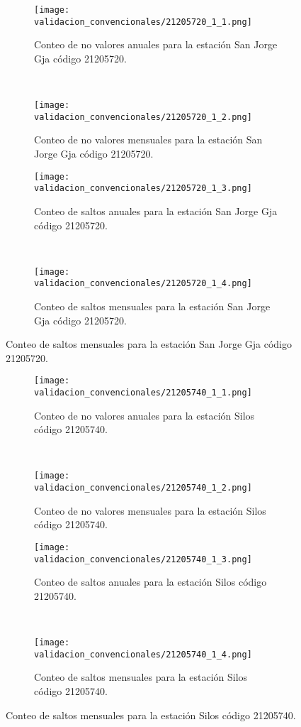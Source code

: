 \begin{figure}[H]\ContinuedFloat
\centering
	\begin{subfigure}[normla]{0.4\textwidth}
	\texttt{[image: validacion\_convencionales/21205720\_1\_1.png]}
		\caption{Conteo de no valores anuales para la estación San Jorge Gja código 21205720.}
		\label{subfig:a1}
		\end{subfigure}
		~
    \begin{subfigure}[normla]{0.4\textwidth}
	\texttt{[image: validacion\_convencionales/21205720\_1\_2.png]}
		\caption{Conteo de no valores mensuales para la estación San Jorge Gja código 21205720.}
		\label{subfig:a2}
		\end{subfigure}
		
    \begin{subfigure}[normla]{0.4\textwidth}
	\texttt{[image: validacion\_convencionales/21205720\_1\_3.png]}
		\caption{Conteo de saltos anuales para la estación San Jorge Gja código 21205720.}
		\label{subfig:a1}
		\end{subfigure}
		~
    \begin{subfigure}[normla]{0.4\textwidth}
	\texttt{[image: validacion\_convencionales/21205720\_1\_4.png]}
		\caption{Conteo de saltos mensuales para la estación San Jorge Gja código 21205720.}
		\label{subfig:a2}
		\end{subfigure}

	
\end{figure}
           
\begin{figure}[H]\ContinuedFloat
\centering
	\begin{subfigure}[normla]{0.4\textwidth}
	\texttt{[image: validacion\_convencionales/21205740\_1\_1.png]}
		\caption{Conteo de no valores anuales para la estación Silos código 21205740.}
		\label{subfig:a1}
		\end{subfigure}
		~
    \begin{subfigure}[normla]{0.4\textwidth}
	\texttt{[image: validacion\_convencionales/21205740\_1\_2.png]}
		\caption{Conteo de no valores mensuales para la estación Silos código 21205740.}
		\label{subfig:a2}
		\end{subfigure}
		
    \begin{subfigure}[normla]{0.4\textwidth}
	\texttt{[image: validacion\_convencionales/21205740\_1\_3.png]}
		\caption{Conteo de saltos anuales para la estación Silos código 21205740.}
		\label{subfig:a1}
		\end{subfigure}
		~
    \begin{subfigure}[normla]{0.4\textwidth}
	\texttt{[image: validacion\_convencionales/21205740\_1\_4.png]}
		\caption{Conteo de saltos mensuales para la estación Silos código 21205740.}
		\label{subfig:a2}
		\end{subfigure}

	
\end{figure}
           
